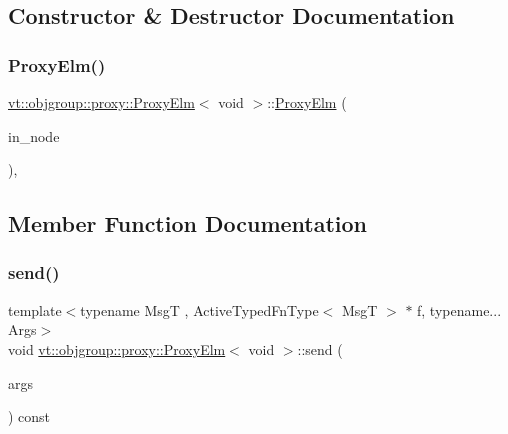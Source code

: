 \subsection{Constructor \& Destructor Documentation}
\mbox{\label{structvt_1_1objgroup_1_1proxy_1_1_proxy_elm_3_01void_01_4_ac0574a043c575dafda3686ff9099a4f1}} 
\subsubsection{\texorpdfstring{Proxy\+Elm()}{ProxyElm()}}
{\footnotesize\ttfamily \hyperlink{structvt_1_1objgroup_1_1proxy_1_1_proxy_elm}{vt\+::objgroup\+::proxy\+::\+Proxy\+Elm}$<$ void $>$\+::\hyperlink{structvt_1_1objgroup_1_1proxy_1_1_proxy_elm}{Proxy\+Elm} (\begin{DoxyParamCaption}\item[{\hyperlink{namespacevt_a866da9d0efc19c0a1ce79e9e492f47e2}{Node\+Type}}]{in\+\_\+node }\end{DoxyParamCaption})\hspace{0.3cm}{\ttfamily [inline]}, {\ttfamily [explicit]}}



\subsection{Member Function Documentation}
\mbox{\label{structvt_1_1objgroup_1_1proxy_1_1_proxy_elm_3_01void_01_4_a823b06cf35e500b7a14f2eadb38c9e6d}} 
\subsubsection{\texorpdfstring{send()}{send()}\hspace{0.1cm}{\footnotesize\ttfamily [1/2]}}
{\footnotesize\ttfamily template$<$typename MsgT , Active\+Typed\+Fn\+Type$<$ Msg\+T $>$ $\ast$ f, typename... Args$>$ \\
void \hyperlink{structvt_1_1objgroup_1_1proxy_1_1_proxy_elm}{vt\+::objgroup\+::proxy\+::\+Proxy\+Elm}$<$ void $>$\+::send (\begin{DoxyParamCaption}\item[{Args \&\&...}]{args }\end{DoxyParamCaption}) const}



